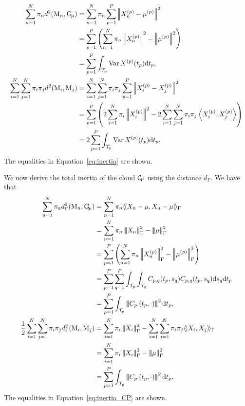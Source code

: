 \begin{align*}
    \sum_{n = 1}^N \pi_n d^2(\pobs{M}_n, \Gmu) 
    &= \sum_{n = 1}^N \pi_n \sum_{p = 1}^P\normLp{\Xnp - \mu^{(p)}}^2\\
    &= \sum_{p = 1}^P\left(\sum_{n = 1}^N \pi_n \normLp{\Xnp}^2 - \normLp{\mup{p}}^2\right) \\
    &= \sum_{p = 1}^P \int_{\TT{p}}\Var{\Xp{p}(t_p)} \dd t_p, \\
\sum_{i = 1}^N \sum_{j = 1}^N \pi_i \pi_j d^2(\pobs{M}_i, \pobs{M}_j) &= \sum_{i = 1}^N \sum_{j = 1}^N \pi_i \pi_j \sum_{p = 1}^P \normLp{\Xp{p}_i - \Xp{p}_j}^2\\
    &= \sum_{p = 1}^P \left(2\sum_{i = 1}^N \pi_i\normLp{\Xp{p}_i}^2 - 2\sum_{i = 1}^N \sum_{j = 1}^N \pi_i\pi_j\inLp{\Xp{p}_i}{\Xp{p}_j}\right) \\
    &= 2\sum_{p = 1}^P \int_{\TT{p}}\Var{\Xp{p}(t_p)} \dd t_p.
\end{align*}
The equalities in Equation~\eqref{eq:inertia} are shown.


We now derive the total inertia of the cloud $\mathcal{C}_{\!P}$ using the distance $d_\Gamma$. We have that
\begin{align}
   \sum_{n = 1}^N \pi_n d_\Gamma^2(\pobs{M}_n, \Gmu) &= \sum_{n = 1}^N \pi_n \inHG{X_n - \mu}{X_n - \mu} \\
   &= \sum_{n = 1}^N \pi_n \normHG{X_n}^2 - \normHG{\mu}^2 \\
   &= \sum_{p = 1}^P \left(\sum_{n = 1}^N \pi_n \normLp{\Xnp}_{\Gamma}^2 - \normLp{\mup{p}}_{\Gamma}^2\right) \\
   &= \sum_{p = 1}^P \sum_{q = 1}^P \int_{\TT{p}} \int_{\TT{q}} C_{p,q}(t_p, s_q)C_{p,q}(t_p, s_q) \dd s_q \dd t_p \\
   &= \sum_{p = 1}^P \int_{\TT{p}} \normH{C_{p \cdot}(t_p, \cdot)}^2 \dd t_p, \\
   \frac{1}{2}\sum_{i = 1}^N \sum_{j = 1}^N \pi_i \pi_j d_\Gamma^2(\pobs{M}_i, \pobs{M}_j)&= \sum_{i = 1}^N \pi_i \normHG{X_i}^2 - \sum_{i = 1}^N \sum_{j = 1}^N \pi_i\pi_j \inHG{X_i}{X_j} \\
    &= \sum_{i = 1}^N \pi_i \normHG{X_i}^2 - \normHG{\mu}^2 \\
    &= \sum_{p = 1}^P \int_{\TT{p}} \normH{C_{p \cdot}(t_p, \cdot)}^2 \dd t_p. 
\end{align}
The equalities in Equation~\eqref{eq:inertia_CP} are shown.


